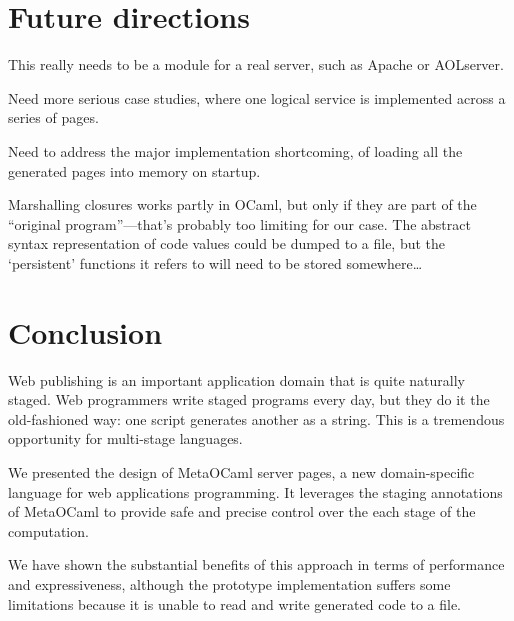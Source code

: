 \documentclass[preprint]{acm_proc_article-sp}
\def\MOC{MetaOCaml}
\begin{document}
\section{Future directions}
\label{sec:future}

  
 This really needs to be a module for a real server, such
  as Apache or AOLserver.
  
 Need more serious case studies, where one logical service
  is implemented across a series of pages.
  
 Need to address the major implementation shortcoming, of
  loading all the generated pages into memory on startup.
  
  Marshalling closures works partly in OCaml, but only if they
  are part of the ``original program''---that's probably too
  limiting for our case.  The abstract syntax representation of
  code values could be dumped to a file, but the `persistent'
  functions it refers to will need to be stored somewhere\ldots



\section{Conclusion}
\label{sec:concl}

Web publishing is an important application domain that is quite
naturally staged.  Web programmers write staged programs every
day, but they do it the old-fashioned way: one script generates
another as a string.  This is a tremendous opportunity for
multi-stage languages.

We presented the design of \MOC{} server pages, a new
domain-specific language for web applications programming.  It
leverages the staging annotations of \MOC{} to provide safe and
precise control over the each stage of the computation.

We have shown the substantial benefits of this approach in terms
of performance and expressiveness, although the prototype
implementation suffers some limitations because it is unable to
read and write generated code to a file.


\raggedright

\end{document}
